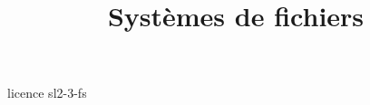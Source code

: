 \documentclass {beamer}
\title {Systèmes de fichiers}
\begin{document}
 {licence}
 {sl2-3-fs}
\end{document}
